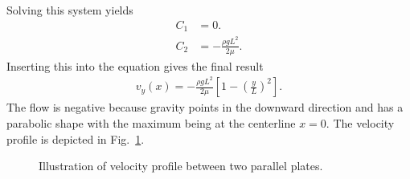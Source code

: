 Solving this system yields
\begin{subequations}
\begin{align}
  C_1 &= 0. \\
  C_2 &= -\frac{\rho g L^2}{2 \mu} .
\end{align}
\end{subequations}
Inserting this into the equation gives the final result
\begin{align}
  v_y(x) = -\frac{\rho g L^2}{2 \mu} \left[ 1 - \left( \frac{y}{L} \right)^2 \right] .
\end{align}
The flow is negative because gravity points in the downward direction and has a parabolic shape with the maximum being at the centerline $x = 0$. The velocity profile is depicted in Fig.~\ref{Fig:ode_fluidFlowParallelPlatesExample}.

\begin{figure}[tb!]
\begin{center}
\caption{Illustration of velocity profile between two parallel plates.}
\label{Fig:ode_fluidFlowParallelPlatesExample}
\end{center}
\end{figure}

